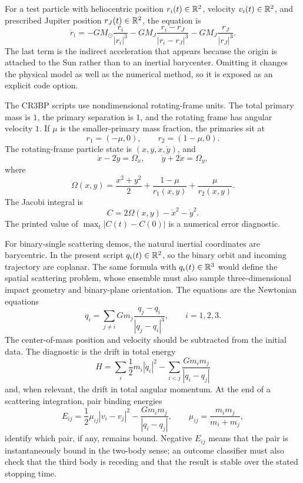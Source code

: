 For a test particle with heliocentric position \(r_i(t)\in\mathbb{R}^2\), velocity
\(v_i(t)\in\mathbb{R}^2\), and prescribed Jupiter position \(r_J(t)\in\mathbb{R}^2\), the
equation is
\[
        \ddot r_i
        =
        -GM_\odot \frac{r_i}{|r_i|^3}
        -GM_J\frac{r_i-r_J}{|r_i-r_J|^3}
        -GM_J\frac{r_J}{|r_J|^3}.
\]
The last term is the indirect acceleration that appears because the origin is
attached to the Sun rather than to an inertial barycenter.  Omitting it changes
the physical model as well as the numerical method, so it is exposed as an
explicit code option.

The CR3BP scripts use nondimensional rotating-frame units.  The total primary
mass is \(1\), the primary separation is \(1\), and the rotating frame has
angular velocity \(1\).  If \(\mu\) is the smaller-primary mass fraction, the
primaries sit at
\[
        r_1=(-\mu,0),\qquad r_2=(1-\mu,0).
\]
The rotating-frame particle state is \((x,y,\dot x,\dot y)\), and
\[
        \ddot x-2\dot y=\Omega_x,\qquad
        \ddot y+2\dot x=\Omega_y,
\]
where
\[
        \Omega(x,y)=
        \frac{x^2+y^2}{2}
        +\frac{1-\mu}{r_1(x,y)}
        +\frac{\mu}{r_2(x,y)} .
\]
The Jacobi integral is
\[
        C=2\Omega(x,y)-\dot x^2-\dot y^2 .
\]
The printed value of \(\max_t |C(t)-C(0)|\) is a numerical error diagnostic.

For binary-single scattering demos, the natural inertial coordinates are
barycentric.  In the present script \(q_i(t)\in\mathbb{R}^2\), so the binary orbit and
incoming trajectory are coplanar.  The same formula with \(q_i(t)\in\mathbb{R}^3\)
would define the spatial scattering problem, whose ensemble must also sample
three-dimensional impact geometry and binary-plane orientation.  The equations
are the Newtonian equations
\[
  \ddot q_i
  =
  \sum_{j\ne i}Gm_j\frac{q_j-q_i}{|q_j-q_i|^3},
  \qquad i=1,2,3.
\]
The center-of-mass position and velocity should be subtracted from the initial
data.  The diagnostic is the drift in total energy
\[
  H=\sum_i\frac12m_i|\dot q_i|^2
  -
  \sum_{i<j}\frac{Gm_im_j}{|q_i-q_j|}
\]
and, when relevant, the drift in total angular momentum.  At the end of a
scattering integration, pair binding energies
\[
  E_{ij}
  =
  \frac12\mu_{ij}|v_i-v_j|^2-\frac{Gm_im_j}{|q_i-q_j|},
  \qquad
  \mu_{ij}=\frac{m_im_j}{m_i+m_j},
\]
identify which pair, if any, remains bound.  Negative \(E_{ij}\) means that the
pair is instantaneously bound in the two-body sense; an outcome classifier must
also check that the third body is receding and that the result is stable over
the stated stopping time.

